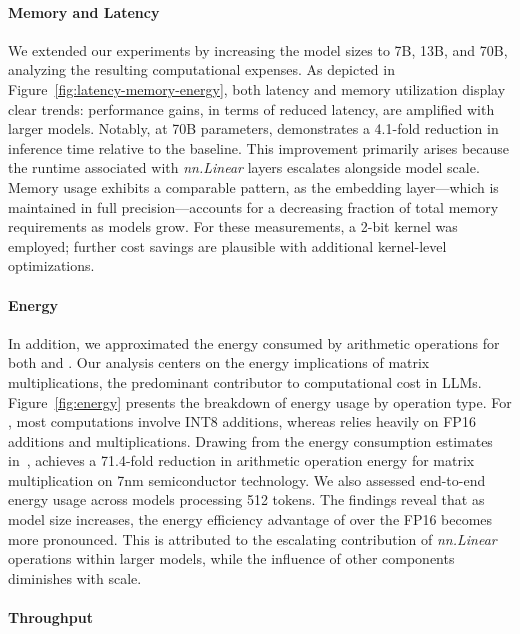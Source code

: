 \paragraph{Memory and Latency}

We extended our experiments by increasing the model sizes to 7B, 13B, and 70B, analyzing the resulting computational expenses. As depicted in Figure~\ref{fig:latency-memory-energy}, both latency and memory utilization display clear trends: performance gains, in terms of reduced latency, are amplified with larger models. Notably, at 70B parameters,  demonstrates a 4.1-fold reduction in inference time relative to the  baseline. This improvement primarily arises because the runtime associated with \emph{nn.Linear} layers escalates alongside model scale. Memory usage exhibits a comparable pattern, as the embedding layer—which is maintained in full precision—accounts for a decreasing fraction of total memory requirements as models grow. For these measurements, a 2-bit kernel was employed; further cost savings are plausible with additional kernel-level optimizations.

\paragraph{Energy}

In addition, we approximated the energy consumed by arithmetic operations for both  and . Our analysis centers on the energy implications of matrix multiplications, the predominant contributor to computational cost in LLMs. Figure~\ref{fig:energy} presents the breakdown of energy usage by operation type. For , most computations involve INT8 additions, whereas  relies heavily on FP16 additions and multiplications. Drawing from the energy consumption estimates in~\cite{energycost, pokebnn},  achieves a 71.4-fold reduction in arithmetic operation energy for matrix multiplication on 7nm semiconductor technology. We also assessed end-to-end energy usage across models processing 512 tokens. The findings reveal that as model size increases, the energy efficiency advantage of  over the FP16  becomes more pronounced. This is attributed to the escalating contribution of \emph{nn.Linear} operations within larger models, while the influence of other components diminishes with scale.

\paragraph{Throughput}


